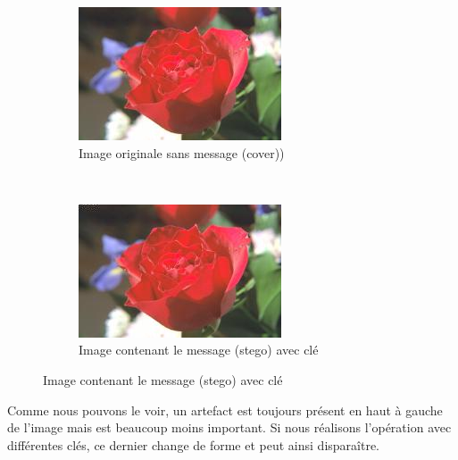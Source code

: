 \begin{figure}[H]
    \centering
    \begin{subfigure}[b]{0.45\textwidth}
	\includegraphics[width=\textwidth]{../SRC/testorig.jpg}
	\caption{Image originale sans message (cover))}
	\label{img:11}
    \end{subfigure}
    ~
    \begin{subfigure}[b]{0.45\textwidth}
	\includegraphics[width=\textwidth]{../SRC/tata.jpg}
	\caption{Image contenant le message (stego) avec clé}
	\label{img:12}
    \end{subfigure}
    \label{fig:key}
\end{figure}
Comme nous pouvons le voir, un artefact est toujours présent en haut à gauche de l'image mais est beaucoup moins important. Si nous réalisons l'opération avec différentes clés, ce dernier change de forme et peut ainsi disparaître.\\\par
